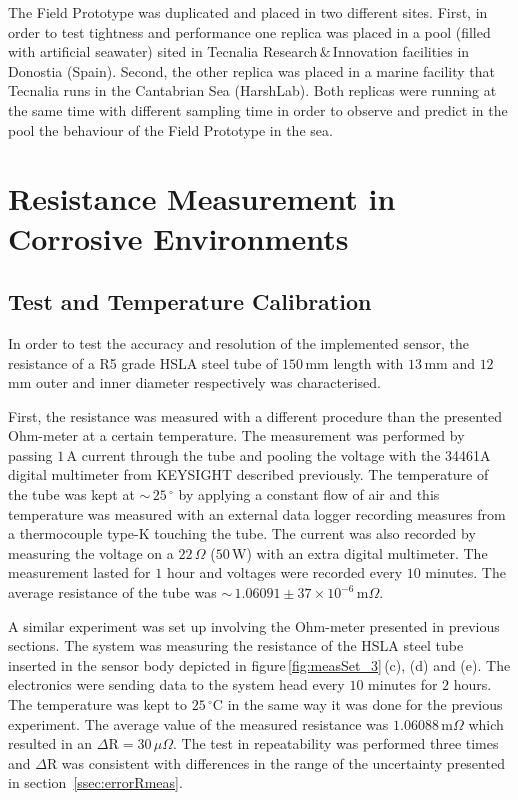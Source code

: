 \documentclass[journal,twoside,web]{ieeecolor}
\begin{document}
The Field Prototype was duplicated and placed in two different sites. First, in order to test tightness and performance one replica was placed in a pool (filled with artificial seawater) sited in Tecnalia Research\,$\&$\,Innovation facilities in Donostia (Spain). Second, the other replica was placed in a marine facility that Tecnalia runs in the Cantabrian Sea (HarshLab). Both replicas were running at the same time with different sampling time in order to observe and predict in the pool the behaviour of the Field Prototype in the sea.
\vspace{0.5cm}
\section{Resistance Measurement in Corrosive Environments}
\label{sec:resMeasCorrEnv}

\subsection{Test and Temperature Calibration}
\label{ssec:tempCalibration}
In order to test the accuracy and resolution of the implemented sensor, the resistance of a R5 grade HSLA steel tube of $150$\,mm length with $13$\,mm and $12$\,mm outer and inner diameter respectively was characterised.

First, the resistance was measured with a different procedure than the presented Ohm-meter at a certain temperature. The measurement was performed by passing $1$\,A current through the tube and pooling the voltage with the 34461A digital multimeter from KEYSIGHT described previously. The temperature of the tube was kept at $\sim$\,$25$\,$^{\circ}$ by applying a constant flow of air and this temperature was measured with an external data logger recording measures from a thermocouple type-K touching the tube. The current was also recorded by measuring the voltage on a $22$\,$\Omega$ ($50$\,W) with an extra digital multimeter. The measurement lasted for $1$ hour and voltages were recorded every $10$ minutes. The average resistance of the tube was $\sim$\,$1.06091\pm37\times10^{-6}$\,m$\Omega$.

A similar experiment was set up involving the Ohm-meter presented in previous sections. The system was measuring the resistance of the HSLA steel tube inserted in the sensor body depicted in figure\,\ref{fig:measSet_3}\,(c), (d) and (e). The electronics were sending data to the system head every $10$ minutes for $2$ hours. The temperature was kept to $25$\,$^{\circ}$C in the same way it was done for the previous experiment. The average value of the measured resistance was $1.06088$\,m$\Omega$ which resulted in an $\Delta$R$=30$\,$\mu\Omega$. The test in repeatability was performed three times and $\Delta$R was consistent with differences in the range of the uncertainty presented in section~\ref{ssec:errorRmeas}.
\end{document}
